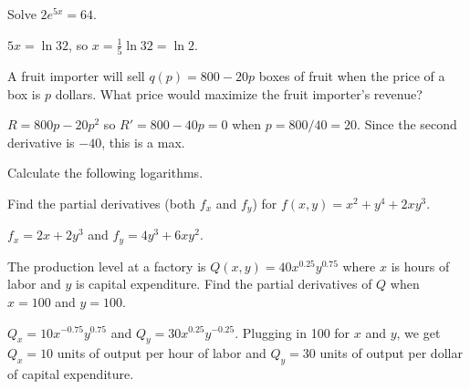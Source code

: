 \documentclass[12pt]{exam}
\newcommand{\ds}{\displaystyle}
\begin{document}
\begin{questions}
\question Solve $2 e^{5x} = 64$. 
\begin{solution}
$5x = \ln 32$, so $x = \frac{1}{5} \ln 32 = \ln 2$. 
\end{solution}
\vfill

\question A fruit importer will sell $q(p) = 800 - 20p$ boxes of fruit when the price of a box is $p$ dollars. What price would maximize the fruit importer's revenue? 
\begin{solution}
$R = 800p - 20p^2$ so $R' = 800 - 40 p = 0$ when $ p = 800/40 = 20$.  Since the second derivative is $-40$, this is a max. 
\end{solution}
\vfill


\question Calculate the following logarithms.
\begin{multicols}{2}
\end{multicols}
\vfill

\newpage

\question Find the partial derivatives (both $f_x$ and $f_y$) for $f(x,y) = x^2 + y^4 + 2xy^3$.
\begin{solution}
$f_x = 2x + 2y^3$ and $f_y = 4y^3 + 6xy^2$.
\end{solution}
\vfill

\question The production level at a factory is $Q(x,y) = 40x^{0.25} y^{0.75}$ where $x$ is hours of labor and $y$ is capital expenditure.  Find the partial derivatives of $Q$ when $x = 100$ and $y = 100$.  %
\begin{solution}
$Q_x = 10 x^{-0.75}y^{0.75}$ and $Q_y = 30 x^{0.25} y^{-0.25}$. Plugging in 100 for $x$ and $y$, we get $Q_x = 10$ units of output per hour of labor and $Q_y = 30$ units of output per dollar of capital expenditure.%
\end{solution}
\vfill 


\end{questions}
\end{document}
